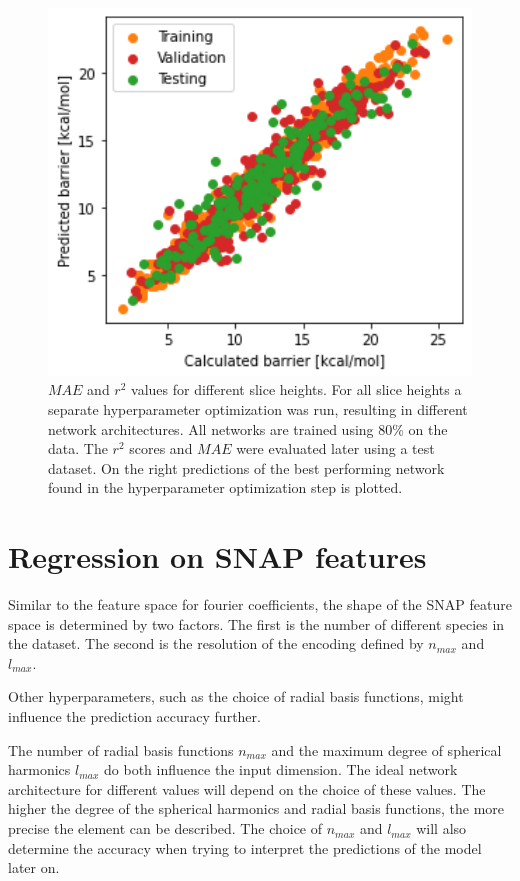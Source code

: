 \begin{figure}[H]
      \includegraphics[width=1.0\textwidth]{figures/regression/fourier/scatterHyperparam.png}
    \endminipage
    \caption[Evaluation of LEFD models]{
      $MAE$ and $r^2$ values for different slice heights.
      For all slice heights a separate hyperparameter optimization was run, resulting in different network architectures.
      All networks are trained using 80\% on the data. The $r^2$ scores and $MAE$ were evaluated later using a test dataset.
      On the right predictions of the best performing network found in the hyperparameter optimization step is plotted.
    }
    \label{fig:fourier_final}
\end{figure}

\newpage
\section{Regression on SNAP features}
\label{sec:Evaluation:snap}

Similar to the feature space for fourier coefficients, the shape of the SNAP feature space is determined by two factors.
The first is the number of different species in the dataset.
The second is the resolution of the encoding defined by $n_{max}$ and $l_{max}$.

Other hyperparameters, such as the choice of radial basis functions, might influence the prediction accuracy further.

The number of radial basis functions $n_{max}$ and the maximum degree of spherical harmonics $l_{max}$ do both influence
the input dimension.
The ideal network architecture for different values will depend on the choice of these values.
The higher the degree of the spherical harmonics and radial basis functions, the more precise the element can be described. %
The choice of $n_{max}$ and $l_{max}$ will also determine the accuracy when trying to interpret the predictions of the model later on.

